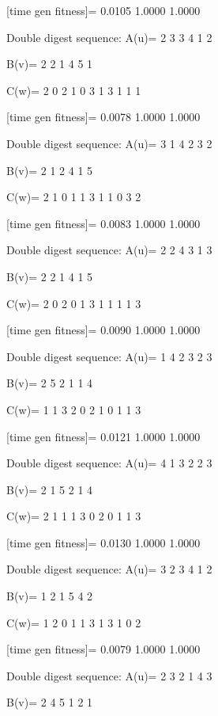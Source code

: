 [time gen fitness]=
    0.0105    1.0000    1.0000

Double digest sequence:
A(u)=
     2     3     3     4     1     2

B(v)=
     2     2     1     4     5     1

C(w)=
     2     0     2     1     0     3     1     3     1     1     1

[time gen fitness]=
    0.0078    1.0000    1.0000

Double digest sequence:
A(u)=
     3     1     4     2     3     2

B(v)=
     2     1     2     4     1     5

C(w)=
     2     1     0     1     1     3     1     1     0     3     2

[time gen fitness]=
    0.0083    1.0000    1.0000

Double digest sequence:
A(u)=
     2     2     4     3     1     3

B(v)=
     2     2     1     4     1     5

C(w)=
     2     0     2     0     1     3     1     1     1     1     3

[time gen fitness]=
    0.0090    1.0000    1.0000

Double digest sequence:
A(u)=
     1     4     2     3     2     3

B(v)=
     2     5     2     1     1     4

C(w)=
     1     1     3     2     0     2     1     0     1     1     3

[time gen fitness]=
    0.0121    1.0000    1.0000

Double digest sequence:
A(u)=
     4     1     3     2     2     3

B(v)=
     2     1     5     2     1     4

C(w)=
     2     1     1     1     3     0     2     0     1     1     3

[time gen fitness]=
    0.0130    1.0000    1.0000

Double digest sequence:
A(u)=
     3     2     3     4     1     2

B(v)=
     1     2     1     5     4     2

C(w)=
     1     2     0     1     1     3     1     3     1     0     2

[time gen fitness]=
    0.0079    1.0000    1.0000

Double digest sequence:
A(u)=
     2     3     2     1     4     3

B(v)=
     2     4     5     1     2     1

